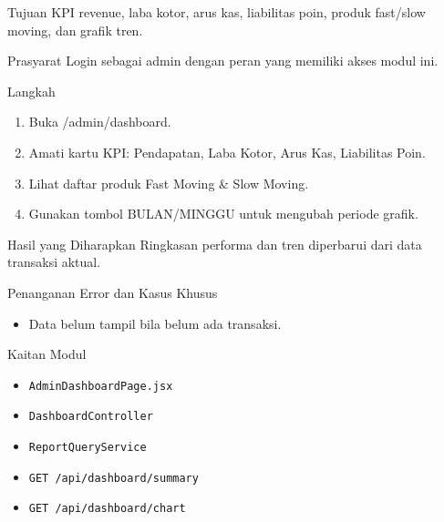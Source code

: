 
\begin{flowsection}{Tujuan}
KPI revenue, laba kotor, arus kas, liabilitas poin, produk fast/slow moving, dan grafik tren.
\end{flowsection}

\begin{flowsection}{Prasyarat}
Login sebagai admin dengan peran yang memiliki akses modul ini.
\end{flowsection}

\begin{flowsection}{Langkah}
\begin{enumerate}
  \item Buka /admin/dashboard.
  \item Amati kartu KPI: Pendapatan, Laba Kotor, Arus Kas, Liabilitas Poin.
  \item Lihat daftar produk Fast Moving \&  Slow Moving.
  \item Gunakan tombol BULAN/MINGGU untuk mengubah periode grafik.
\end{enumerate}
\end{flowsection}


\begin{flowsection}{Hasil yang Diharapkan}
Ringkasan performa dan tren diperbarui dari data transaksi aktual.
\end{flowsection}

\begin{flowsection}{Penanganan Error dan Kasus Khusus}
\begin{itemize}
  \item Data belum tampil bila belum ada transaksi.
\end{itemize}
\end{flowsection}

\begin{flowsection}{Kaitan Modul}
\begin{itemize}
  \item \texttt{AdminDashboardPage.jsx}
  \item \texttt{DashboardController}
  \item \texttt{ReportQueryService}
  \item \texttt{GET /api/dashboard/summary}
  \item \texttt{GET /api/dashboard/chart}
\end{itemize}
\end{flowsection}

